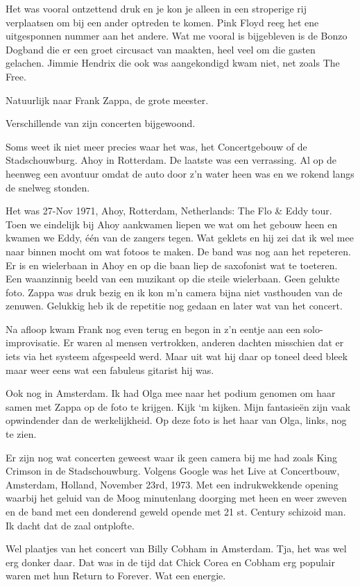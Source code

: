 \documentclass[10pt,twoside,openright]{memoir}
\begin{document}
Het was vooral ontzettend druk en je kon je alleen in een stroperige rij verplaatsen om bij een ander optreden te komen. 
Pink Floyd reeg het ene uitgesponnen nummer aan het andere. Wat me vooral is bijgebleven is de Bonzo Dogband die er een groet circusact van maakten, heel veel om die gasten gelachen. Jimmie Hendrix die ook was aangekondigd kwam niet, net zoals The Free.

Natuurlijk naar Frank Zappa, de grote meester. 

Verschillende van zijn concerten bijgewoond.

Soms weet ik niet meer precies waar het was, het Concertgebouw of de Stadschouwburg. Ahoy in Rotterdam. De laatste was een verrassing. Al op de heenweg een avontuur omdat de auto door z’n water heen was en we rokend langs de snelweg stonden. 

Het was 27-Nov 1971, Ahoy, Rotterdam, Netherlands: The Flo & Eddy tour. Toen we eindelijk bij Ahoy aankwamen liepen we wat om het gebouw heen en kwamen we Eddy, één van de zangers tegen. Wat geklets en hij zei dat ik wel mee naar binnen mocht om wat fotoos te maken. De band was nog aan het repeteren. Er is en wielerbaan in Ahoy en op die baan liep de saxofonist wat te toeteren. Een waanzinnig beeld van een muzikant op die steile wielerbaan. Geen gelukte foto. Zappa was druk bezig en ik kon m’n camera bijna niet vasthouden van de zenuwen. Gelukkig heb ik de repetitie nog gedaan en later wat van het concert. 

Na afloop kwam Frank nog even terug en begon in z’n eentje aan een solo-improvisatie. Er waren al mensen vertrokken, anderen dachten misschien dat er iets via het systeem afgespeeld werd. Maar uit wat hij daar op toneel deed bleek maar weer eens wat een fabuleus gitarist hij was.

Ook nog in Amsterdam. Ik had Olga mee naar het podium genomen om haar samen met Zappa op de foto te krijgen. Kijk ‘m kijken. Mijn fantasieën zijn vaak opwindender dan de werkelijkheid. Op deze foto is het haar van Olga, links, nog te zien. 

Er zijn nog wat concerten geweest waar ik geen camera bij me had zoals King Crimson in de Stadschouwburg. Volgens Google was het Live at Concertbouw, Amsterdam, Holland, November 23rd, 1973. Met een indrukwekkende opening waarbij het geluid van de Moog minutenlang doorging met heen en weer zweven en de band met een donderend geweld opende met 21 st. Century schizoid man. Ik dacht dat de zaal ontplofte.

Wel plaatjes van het concert van Billy Cobham in Amsterdam. Tja, het was wel erg donker daar. Dat was in de tijd dat Chick Corea en Cobham erg populair waren met hun Return to Forever. Wat een energie. 
\end{document}
